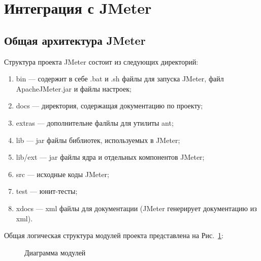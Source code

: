 \section{Интеграция с JMeter}

\subsection{Общая архитектура JMeter}

Структура проекта JMeter состоит из следующих директорий:

\begin{enumerate}
\item bin --- содержит в себе .bat и .sh файлы для запуска JMeter, файл ApacheJMeter.jar и файлы настроек;
\item docs --- директория, содержащая документацию по проекту;
\item extras --- дополнительне фалйлы для утилиты ant;
\item lib --- jar файлы библиотек, используемых в JMeter;
\item lib/ext --- jar файлы ядра и отдельных компонентов JMeter;
\item src --- исходные коды JMeter;
\item test --- юнит-тесты;
\item xdocs --- xml файлы для документации (JMeter генерирует документацию из xml).
\end{enumerate}

Общая логическая структура модулей проекта представлена на Рис.~\ref{ris:Diagram3.png}:

\begin{figure}[ht]
\caption{Диаграмма модулей}
\label{ris:Diagram3.png}
\end{figure}

